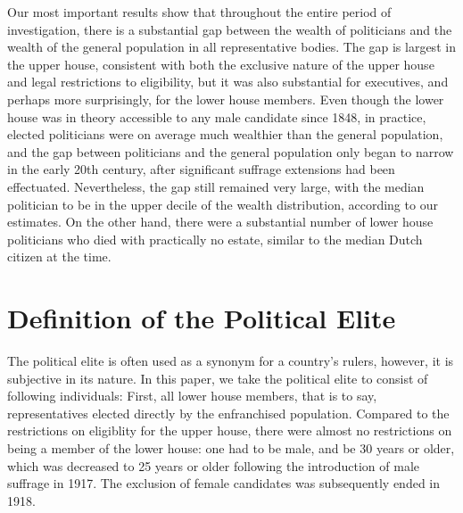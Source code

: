     Our most important results show that throughout the entire period of investigation, there is a substantial gap between the wealth of politicians and the wealth of the general population in all representative bodies. The gap is largest in the upper house, consistent with both the exclusive nature of the upper house and legal restrictions to eligibility, but it was also substantial for executives, and perhaps more surprisingly, for the lower house members. Even though the lower house was in theory accessible to any male candidate since 1848, in practice, elected politicians were on average much wealthier than the general population, and the gap between politicians and the general population only began to narrow in the early 20th century, after significant suffrage extensions had been effectuated. Nevertheless, the gap still remained very large, with the median politician to be in the upper decile of the wealth distribution, according to our estimates. On the other hand, there were a substantial number of lower house politicians who died with practically no estate, similar to the median Dutch citizen at the time.\autocite{de2020exploring}

\section{Definition of the Political Elite}
    The political elite is often used as a synonym for a country's rulers, however, it is subjective in its nature. In this paper, we take the political elite to consist of following individuals: First, all lower house members, that is to say, representatives elected directly by the enfranchised population. Compared to the restrictions on eligiblity for the upper house, there were almost no restrictions on being a member of the lower house: one had to be male, and be 30 years or older, which was decreased to 25 years or older following the introduction of male suffrage in 1917. The exclusion of female candidates was subsequently ended in 1918. \autocite{van2018tussen} 

